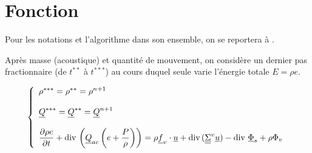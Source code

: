 
%
%
%
%



\hypertarget{cfener}{}

\vspace{1cm}
\section*{Fonction}

Pour les notations et l'algorithme dans son ensemble,
on se reportera à .

Après masse (acoustique) et quantité de mouvement,
on considère un dernier pas fractionnaire (de $t^{**}$ à $t^{***}$)
au cours duquel seule varie l'énergie totale $E = \rho e$.

\begin{equation}\label{Cfbl_Cfener_eq_energie_cfener}
\left\{\begin{array}{l}
\rho^{***}=\rho^{**}=\rho^{n+1}\\
\\
\underline{Q}^{***}=\underline{Q}^{**}=\underline{Q}^{n+1}\\
\\
\displaystyle\frac{\partial \rho e}{\partial t}
+ \text{div}\,\left( \underline{Q}_{ac} \left(e+\displaystyle\frac{P}{\rho}\right) \right)
= \rho\underline{f}_v\cdot\underline{u}
+ \text{div}\,(\underline{\underline{\Sigma}}^v \underline{u})
- \text{div}\,{\,\underline{\Phi}_s} + \rho\Phi_v
\end{array}\right.
\end{equation}


